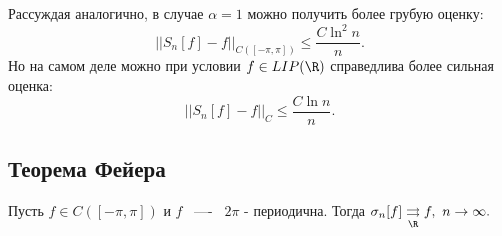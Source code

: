 \begin{remark}
    Рассуждая аналогично, в случае $\alpha = 1$ можно получить более грубую оценку: 
    $$
    ||S_n[f] - f||_{C([-\pi, \pi])} \le \frac{C\ln^2n}{n}.
    $$
    Но на самом деле можно при условии $f \in LIP(\R)$ справедлива более сильная оценка: 
    $$
    ||S_n[f] - f||_C \le \frac{C \ln n}{n}.
    $$
\end{remark}

\subsection{Теорема Фейера}
\begin{theorem}
    Пусть $f \in C([-\pi, \pi])$ и $f$ ~----~ $2\pi$ - периодична. Тогда $\sigma_n[f] \underset{\R}{\rightrightarrows} f, \ n \rightarrow \infty.$
\end{theorem}
